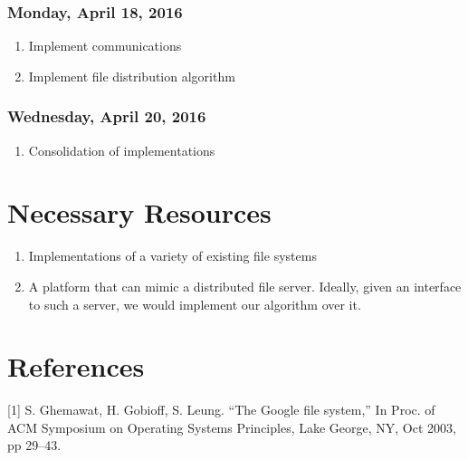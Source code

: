 \documentclass{article}
\begin{document}
\subsubsection*{Monday, April 18, 2016}
\begin{enumerate}
\item Implement communications
\item Implement file distribution algorithm
\end{enumerate}

\subsubsection*{Wednesday, April 20, 2016}
\begin{enumerate}
\item Consolidation of implementations
\end{enumerate}

\section{Necessary Resources}

\begin{enumerate}
\item Implementations of a variety of existing file systems
\item A platform that can mimic a distributed file server. Ideally, given an interface to such a server, we would implement our algorithm over it.
\end{enumerate}

\section{References}
[1] S. Ghemawat, H. Gobioff, S. Leung. ``The Google file system,'' In Proc.
of ACM Symposium on Operating Systems Principles, Lake George,
NY, Oct 2003, pp 29–43.
\end{document}
